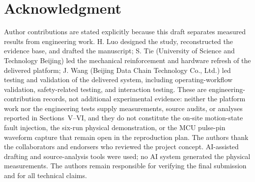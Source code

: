 \documentclass[conference]{IEEEtran}
\begin{document}
\section*{Acknowledgment}
Author contributions are stated explicitly because this draft separates measured results from engineering work. H. Luo designed the study, reconstructed the evidence base, and drafted the manuscript; S. Tie (University of Science and Technology Beijing) led the mechanical reinforcement and hardware refresh of the delivered platform; J. Wang (Beijing Data Chain Technology Co., Ltd.) led testing and validation of the delivered system, including operating-workflow validation, safety-related testing, and interaction testing. These are engineering-contribution records, not additional experimental evidence: neither the platform work nor the engineering tests supply measurements, source audits, or analyses reported in Sections~V--VI, and they do not constitute the on-site motion-state fault injection, the six-run physical demonstration, or the MCU pulse-pin waveform capture that remain open in the reproduction plan. The authors thank the collaborators and endorsers who reviewed the project concept. AI-assisted drafting and source-analysis tools were used; no AI system generated the physical measurements. The authors remain responsible for verifying the final submission and for all technical claims.



\end{document}
